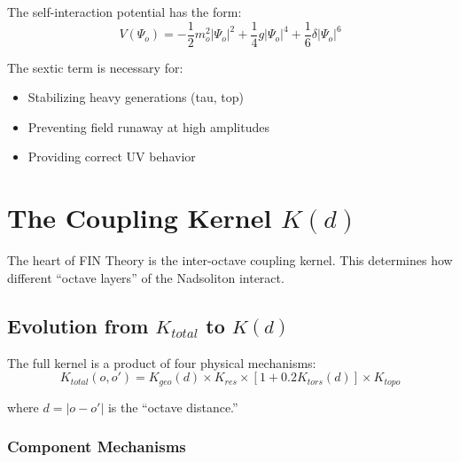 \documentclass[11pt,a4paper]{book}
\theoremstyle{remark}
\begin{document}
The self-interaction potential has the form:
\begin{equation}
V(\Psi_o) = -\frac{1}{2} m_o^2 |\Psi_o|^2 + \frac{1}{4} g |\Psi_o|^4 + \frac{1}{6} \delta |\Psi_o|^6
\end{equation}

The sextic term is necessary for:
\begin{itemize}
    \item Stabilizing heavy generations (tau, top)
    \item Preventing field runaway at high amplitudes
    \item Providing correct UV behavior
\end{itemize}

\section{The Coupling Kernel $K(d)$}

The heart of FIN Theory is the inter-octave coupling kernel. This determines how different ``octave layers'' of the Nadsoliton interact.

\subsection{Evolution from $K_{total}$ to $K(d)$}

The full kernel is a product of four physical mechanisms:
\begin{equation}
K_{total}(o, o') = K_{geo}(d) \times K_{res} \times [1 + 0.2 K_{tors}(d)] \times K_{topo}
\end{equation}

where $d = |o - o'|$ is the ``octave distance.''

\subsubsection{Component Mechanisms}
\end{document}
